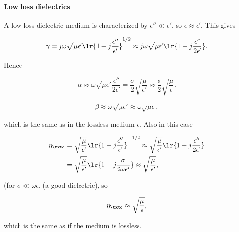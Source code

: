 \paragraph{Low loss dielectrics}

A low loss dielectric medium is characterized by \( \epsilon'' \ll \epsilon' \), so \( \epsilon \approx \epsilon' \).  This gives

\begin{equation}\label{eqn:uwavesLecture3:320}
\gamma
=
j \omega \sqrt{\mu \epsilon' } \lr{ 1 -j \frac{\epsilon''}{\epsilon'}}^{1/2}
\approx
j \omega \sqrt{\mu \epsilon' } \lr{ 1 - j \frac{\epsilon''}{2 \epsilon'}}.
\end{equation}

Hence

\begin{equation}\label{eqn:uwavesLecture3:340}
\alpha
\approx
\omega \sqrt{\mu \epsilon'} \frac{\epsilon''}{2 \epsilon'}
=
\frac{\sigma}{2} \sqrt{\frac{\mu}{\epsilon'}}
\approx
\frac{\sigma}{2} \sqrt{\frac{\mu}{\epsilon}}.
\end{equation}

\begin{equation}\label{eqn:uwavesLecture3:360}
\beta
\approx
\omega \sqrt{\mu \epsilon'}
\approx
\omega \sqrt{\mu \epsilon},
\end{equation}

which is the same as in the lossless medium \( \epsilon \).  Also in this case

\begin{equation}\label{eqn:uwavesLecture3:380}
\begin{aligned}
\eta_\txtc
&=
\sqrt{\frac{\mu}{\epsilon'}} \lr{ 1 - j \frac{\epsilon''}{\epsilon'} }^{-1/2}
\approx
\sqrt{\frac{\mu}{\epsilon'}} \lr{ 1 + j \frac{\epsilon''}{2 \epsilon'} }
\\ &=
\sqrt{\frac{\mu}{\epsilon'}} \lr{ 1 + j \frac{\sigma}{2 \omega \epsilon'} }
\approx
\sqrt{\frac{\mu}{\epsilon'}},
\end{aligned}
\end{equation}

(for \( \sigma \ll \omega \epsilon \), (a good dielectric), so

\begin{equation}\label{eqn:uwavesLecture3:400}
\eta_\txtc \approx \sqrt{\frac{\mu}{\epsilon}},
\end{equation}

which is the same as if the medium is lossless.

